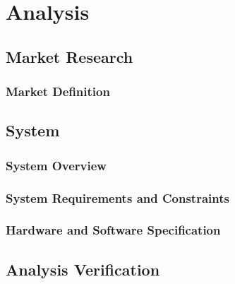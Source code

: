 \documentclass[12pt, letterpaper]{report}
\begin{document}
\chapter{Analysis}
\section{Market Research}
\subsection{Market Definition}


\section{System}
\subsection{System Overview}
\subsection{System Requirements and Constraints}
\subsection{Hardware and Software Specification}

\section{Analysis Verification}
\end{document}
